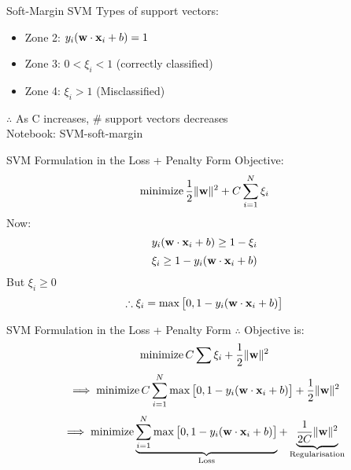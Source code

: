 \documentclass{beamer}
\begin{document}
	\begin{frame}{Soft-Margin SVM}
		Types of support vectors:
		\begin{itemize}
			\item Zone 2: $y_{i}(\mathbf{w} \cdot \mathbf{x}_{i} + b) = 1$
			\item Zone 3: $0 < \xi_{i} < 1$ (correctly classified)
			\item Zone 4: $\xi_{i} > 1$ (Misclassified)
		\end{itemize}
		$\therefore$ As C increases, \# support vectors decreases \\
		\vspace{1cm}
		Notebook: SVM-soft-margin
	\end{frame}
	\begin{frame}{SVM Formulation in the Loss + Penalty Form}
		Objective:
		$$\operatorname{minimize} \frac{1}{2}\|\mathbf{w}\|^{2} + C\sum_{i=1}^{N}\xi_{i}$$
		Now:
		$$y_{i}(\mathbf{w} \cdot \mathbf{x}_{i} + b) \geq 1 - \xi_{i}$$
		$$\xi_{i} \geq 1 - y_{i}(\mathbf{w} \cdot \mathbf{x}_{i} + b)$$
		But $\xi_{i} \geq 0$ \\
		$$\therefore \xi_{i} = \max \big[0, 1 - y_{i}(\mathbf{w} \cdot \mathbf{x}_{i} + b)\big]$$
	\end{frame}
	\begin{frame}{SVM Formulation in the Loss + Penalty Form}
		$\therefore$ Objective is:
		$$\operatorname{minimize} C \sum \xi_{i} + \frac{1}{2}\|\mathbf{w}\|^{2}$$
		$$\implies \operatorname{minimize} C \sum_{i=1}^{N} \max\big[0, 1 - y_{i}(\mathbf{w} \cdot \mathbf{x}_{i} + b)\big] + \frac{1}{2}\|\mathbf{w}\|^{2}$$
		$$\implies \operatorname{minimize} \underbrace{\sum_{i=1}^{N}\max \big[0, 1-y_{i}(\mathbf{w} \cdot \mathbf{x}_{i} + b)\big]}_\text{Loss} + \underbrace{ \frac{1}{2C}\|\mathbf{w}\|^{2}}_\text{Regularisation}$$
	\end{frame}
	

{
	
}
\end{document}
